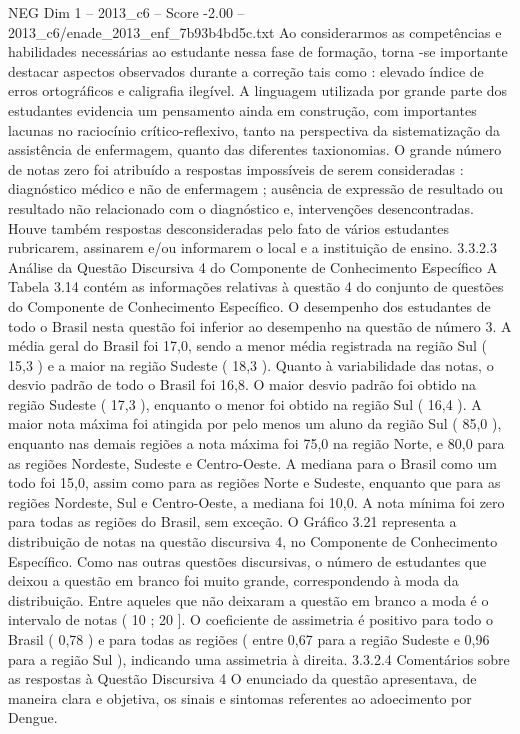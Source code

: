 \begin{textsample}{NEG Dim 1 – 2013\_c6 – Score -2.00 – 2013\_c6/enade\_2013\_enf\_7b93b4bd5c.txt}
Ao considerarmos as competências e habilidades necessárias ao estudante nessa fase de formação, torna -se importante destacar aspectos observados durante a correção tais como : elevado índice de erros ortográficos e caligrafia ilegível.
A linguagem utilizada por grande parte dos estudantes evidencia um pensamento ainda em construção, com importantes lacunas no raciocínio crítico-reflexivo, tanto na perspectiva da sistematização da assistência de enfermagem, quanto das diferentes taxionomias.
O grande número de notas zero foi atribuído a respostas impossíveis de serem consideradas : diagnóstico médico e não de enfermagem ; ausência de expressão de resultado ou resultado não relacionado com o diagnóstico e, intervenções desencontradas.
Houve também respostas desconsideradas pelo fato de vários estudantes rubricarem, assinarem e/ou informarem o local e a instituição de ensino. 3.3.2.3 Análise da Questão Discursiva 4 do Componente de Conhecimento Específico A Tabela 3.14 contém as informações relativas à questão 4 do conjunto de questões do Componente de Conhecimento Específico.
O desempenho dos estudantes de todo o Brasil nesta questão foi inferior ao desempenho na questão de número 3.
A média geral do Brasil foi 17,0, sendo a menor média registrada na região Sul ( 15,3 ) e a maior na região Sudeste ( 18,3 ).
Quanto à variabilidade das notas, o desvio padrão de todo o Brasil foi 16,8.
O maior desvio padrão foi obtido na região Sudeste ( 17,3 ), enquanto o menor foi obtido na região Sul ( 16,4 ).
A maior nota máxima foi atingida por pelo menos um aluno da região Sul ( 85,0 ), enquanto nas demais regiões a nota máxima foi 75,0 na região Norte, e 80,0 para as regiões Nordeste, Sudeste e Centro-Oeste.
A mediana para o Brasil como um todo foi 15,0, assim como para as regiões Norte e Sudeste, enquanto que para as regiões Nordeste, Sul e Centro-Oeste, a mediana foi 10,0.
A nota mínima foi zero para todas as regiões do Brasil, sem exceção.
O Gráfico 3.21 representa a distribuição de notas na questão discursiva 4, no Componente de Conhecimento Específico.
Como nas outras questões discursivas, o número de estudantes que deixou a questão em branco foi muito grande, correspondendo à moda da distribuição.
Entre aqueles que não deixaram a questão em branco a moda é o intervalo de notas ( 10 ; 20 ].
O coeficiente de assimetria é positivo para todo o Brasil ( 0,78 ) e para todas as regiões ( entre 0,67 para a região Sudeste e 0,96 para a região Sul ), indicando uma assimetria à direita. 3.3.2.4 Comentários sobre as respostas à Questão Discursiva 4 O enunciado da questão apresentava, de maneira clara e objetiva, os sinais e sintomas referentes ao adoecimento por Dengue.

\end{textsample}
